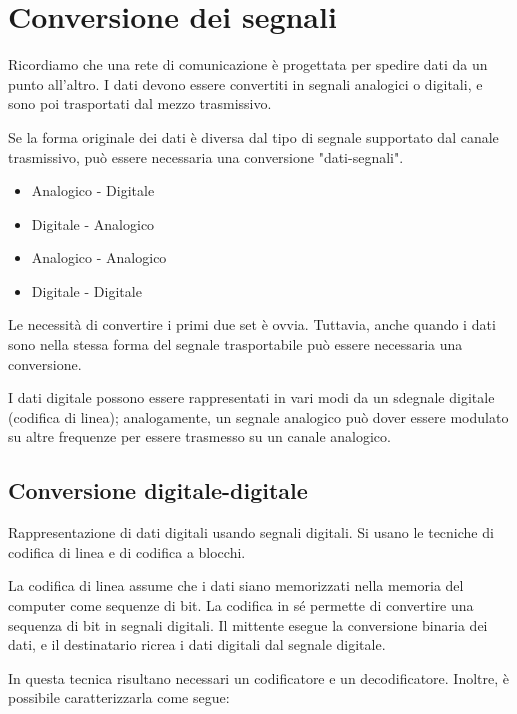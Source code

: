 \section{Conversione dei segnali}

Ricordiamo che una rete di comunicazione è progettata per spedire dati da un punto all'altro. I dati devono essere convertiti in segnali analogici o digitali, e sono poi trasportati dal mezzo trasmissivo.

Se la forma originale dei dati è diversa dal tipo di segnale supportato dal canale trasmissivo, può essere necessaria una conversione "dati-segnali".

\begin{itemize}
    \item Analogico - Digitale
    \item Digitale - Analogico
    \item Analogico - Analogico
    \item Digitale - Digitale
\end{itemize}

Le necessità di convertire i primi due set è ovvia. Tuttavia, anche quando i dati sono nella stessa forma del segnale trasportabile può essere necessaria una conversione. 

I dati digitale possono essere rappresentati in vari modi da un sdegnale digitale (codifica di linea); analogamente, un segnale analogico può dover essere modulato su altre frequenze per essere trasmesso su un canale analogico.

\subsection{Conversione digitale-digitale}

Rappresentazione di dati digitali usando segnali digitali. Si usano le tecniche di codifica di linea e di codifica a blocchi.

\vspace{3mm}

La codifica di linea assume che i dati siano memorizzati nella memoria del computer come sequenze di bit. La codifica in sé permette di convertire una sequenza di bit in segnali digitali. Il mittente esegue la conversione binaria dei dati, e il destinatario ricrea i dati digitali dal segnale digitale.

In questa tecnica risultano necessari un codificatore e un decodificatore. Inoltre, è possibile caratterizzarla come segue:

